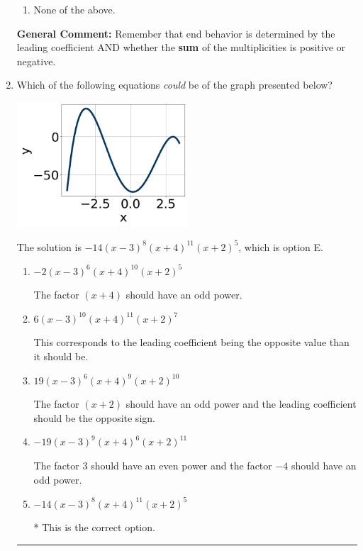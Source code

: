 \documentclass{extbook}[14pt]
\newcommand{\litem}[1]{\item #1

\rule{\textwidth}{0.4pt}}
\begin{document}
\begin{enumerate}
{\begin{enumerate}[label=\Alph*.]
\begin{multicols}{2}
\end{multicols}\item None of the above.\end{enumerate}
\textbf{General Comment:} Remember that end behavior is determined by the leading coefficient AND whether the \textbf{sum} of the multiplicities is positive or negative.
}
\litem{
Which of the following equations \textit{could} be of the graph presented below?

\begin{center}
    \includegraphics[width=0.5\textwidth]{../Figures/polyGraphToFunctionCopyC.png}
\end{center}


The solution is \( -14(x - 3)^{8} (x + 4)^{11} (x + 2)^{5} \), which is option E.\begin{enumerate}[label=\Alph*.]
\item \( -2(x - 3)^{6} (x + 4)^{10} (x + 2)^{5} \)

The factor $(x + 4)$ should have an odd power.
\item \( 6(x - 3)^{10} (x + 4)^{11} (x + 2)^{7} \)

This corresponds to the leading coefficient being the opposite value than it should be.
\item \( 19(x - 3)^{6} (x + 4)^{9} (x + 2)^{10} \)

The factor $(x + 2)$ should have an odd power and the leading coefficient should be the opposite sign.
\item \( -19(x - 3)^{9} (x + 4)^{6} (x + 2)^{11} \)

The factor $3$ should have an even power and the factor $-4$ should have an odd power.
\item \( -14(x - 3)^{8} (x + 4)^{11} (x + 2)^{5} \)

* This is the correct option.
\end{enumerate}

}
\end{enumerate}
\end{document}
